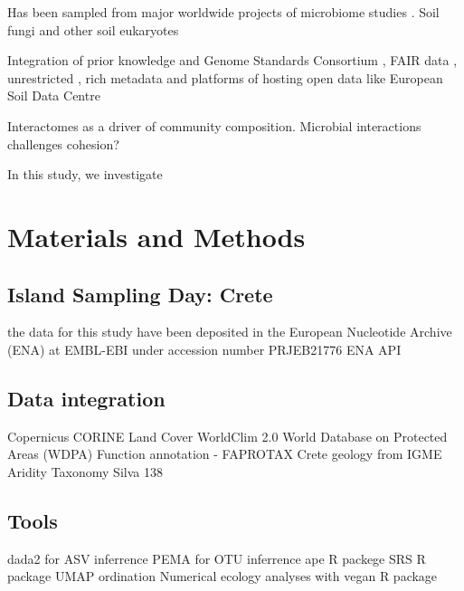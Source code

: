 \documentclass[unnumsec,webpdf,contemporary,large]{oup-authoring-template}%
\theoremstyle{thmstyleone}%
\theoremstyle{thmstyletwo}%
\theoremstyle{thmstylethree}%
\begin{document}
Has been sampled from major worldwide projects of microbiome studies \citep{Vasar2022, Labouyrie2023, Bahram2018, Orgiazzi2018}. Soil fungi \citep{Mikryukov2023, Davison2021, Tedersoo2021} and other soil eukaryotes \citep{Aslani2022}


\citep{Vogiatzakis2008_crete}
\citep{Vogiatzakis2016}

\citep{Sfenthourakis2017}
\citep{Vogiatzakis2008_med}

Integration of prior knowledge and 
Genome Standards Consortium \citep{Field2011}, FAIR data \citep{Wilkinson2016}, unrestricted \citep{Amann2019},
rich metadata and platforms of hosting open data like European Soil Data Centre \citep{Panagos2022}

Interactomes as a driver of community composition. Microbial interactions challenges \citep{Faust2021} cohesion? 

In this study, we investigate


\section{Materials and Methods}\label{methods}


\subsection{Island Sampling Day: Crete}\label{isd_data}

the data for this study have been deposited in the European Nucleotide Archive (ENA) at EMBL-EBI under accession number PRJEB21776
ENA API \citep{Yuan2023}

\subsection{Data integration}\label{data}

Copernicus CORINE Land Cover \citep{CLC2023}
WorldClim 2.0 \citep{Fick2017}
World Database on Protected Areas (WDPA) \citep{Hanson2022}
Function annotation - FAPROTAX \citep{Louca2016}
Crete geology from IGME
Aridity
Taxonomy Silva 138 \citep{Quast2012}

\subsection{Tools}\label{tools}
dada2 for ASV inferrence \citep{Callahan2016}
PEMA for OTU inferrence \citep{Zafeiropoulos2020}
ape R packege \citep{Paradis2004}
SRS R package \citep{Beule2020}
UMAP ordination \citep{mcinnes2018umap-software}
Numerical ecology analyses with vegan R package \citep{vegan}
\end{document}
